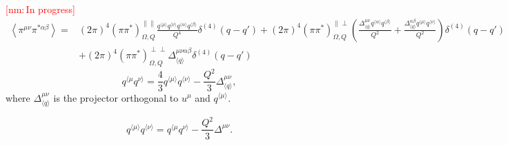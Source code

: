 \documentclass[aps,prd,preprint,nofootinbib,amsmath,amssymb,showpacs,longbibliography,singlecolumn,superscriptaddress,10pt]{revtex4-1}
\theoremstyle{plain}
\theoremstyle{definition}
\newcommand{\nm}[1]{{\textcolor{red}{[nm:\,{#1}]}}}
\begin{document}
\nm{In progress}
\begin{equation}
\begin{aligned}
    \left\langle \pi^{\mu \nu} \pi^{*\alpha\beta} \right\rangle
= &
(2 \pi)^{4}
\left( \pi \pi^{*} \right)_{\Omega, Q}^{\parallel\parallel}\frac{q^{\langle \mu \rangle}q^{\langle \nu \rangle}
q^{\langle \alpha \rangle}q^{\langle \beta \rangle}}{Q^{4}}
\delta^{(4)}(q-q') + (2 \pi)^{4}
\left( \pi \pi^{*} \right)_{\Omega, Q}^{\parallel\perp} \left( \frac{\Delta^{\mu\nu}_{\langle q \rangle} q^{\langle \alpha \rangle} q^{\langle \beta \rangle}}{Q^2} + \frac{\Delta^{\alpha\beta}_{\langle q \rangle} q^{\langle \mu \rangle} q^{\langle \nu \rangle}}{Q^2} \right)
\delta^{(4)}(q-q') \\
& + (2 \pi)^{4}
\left( \pi \pi^{*} \right)_{\Omega, Q}^{\perp\perp}\Delta^{\mu\nu\alpha\beta}_{\langle q \rangle}
\delta^{(4)}(q-q')
\end{aligned}
\end{equation}
\begin{equation}
    q^{\langle \mu} q^{\nu \rangle} = \frac{4}{3} q^{\langle \mu \rangle} q^{\langle \nu \rangle} - \frac{Q^2}{3} \Delta^{\mu\nu}_{\langle q \rangle} ,
\end{equation}
where $\Delta^{\mu\nu}_{\langle q \rangle}$ is the projector orthogonal to $u^{\mu}$ and $q^{\langle \mu \rangle}$.

\begin{equation}
    q^{\langle \mu \rangle} q^{\langle \nu \rangle} = q^{\langle \mu} q^{\nu \rangle} - \frac{Q^2}{3} \Delta^{\mu\nu} .
\end{equation}


\end{document}
